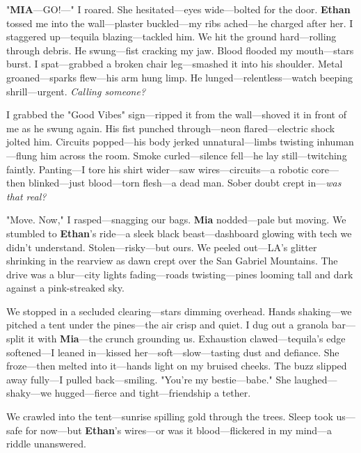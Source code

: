 \documentclass{article}
\begin{document}
"\textbf{MIA}—GO!—" I roared. She hesitated—eyes wide—bolted for the door. \textbf{Ethan} tossed me into the wall—plaster buckled—my ribs ached—he charged after her. I staggered up—tequila blazing—tackled him. We hit the ground hard—rolling through debris. He swung—fist cracking my jaw. Blood flooded my mouth—stars burst. I spat—grabbed a broken chair leg—smashed it into his shoulder. Metal groaned—sparks flew—his arm hung limp. He lunged—relentless—watch beeping shrill—urgent. \textit{Calling someone?}

I grabbed the "Good Vibes" sign—ripped it from the wall—shoved it in front of me as he swung again. His fist punched through—neon flared—electric shock jolted him. Circuits popped—his body jerked unnatural—limbs twisting inhuman—flung him across the room. Smoke curled—silence fell—he lay still—twitching faintly. Panting—I tore his shirt wider—saw wires—circuits—a robotic core—then blinked—just blood—torn flesh—a dead man. Sober doubt crept in—\textit{was that real?}

"Move. Now," I rasped—snagging our bags. \textbf{Mia} nodded—pale but moving. We stumbled to \textbf{Ethan}’s ride—a sleek black beast—dashboard glowing with tech we didn’t understand. Stolen—risky—but ours. We peeled out—LA’s glitter shrinking in the rearview as dawn crept over the San Gabriel Mountains. The drive was a blur—city lights fading—roads twisting—pines looming tall and dark against a pink-streaked sky.

We stopped in a secluded clearing—stars dimming overhead. Hands shaking—we pitched a tent under the pines—the air crisp and quiet. I dug out a granola bar—split it with \textbf{Mia}—the crunch grounding us. Exhaustion clawed—tequila’s edge softened—I leaned in—kissed her—soft—slow—tasting dust and defiance. She froze—then melted into it—hands light on my bruised cheeks. The buzz slipped away fully—I pulled back—smiling. "You’re my bestie—babe." She laughed—shaky—we hugged—fierce and tight—friendship a tether.

We crawled into the tent—sunrise spilling gold through the trees. Sleep took us—safe for now—but \textbf{Ethan}’s wires—or was it blood—flickered in my mind—a riddle unanswered.
\end{document}
